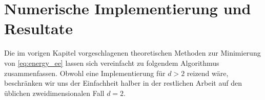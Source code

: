 \documentclass{mythesis}
\begin{document}


\chapter{Numerische Implementierung und Resultate} \label{chap:numerics}

Die im vorigen Kapitel vorgeschlagenen theoretischen Methoden zur Minimierung von \eqref{eq:energy_ee} lassen sich vereinfacht zu folgendem Algorithmus zusammenfassen.
Obwohl eine Implementierung für $d > 2$ reizend wäre, beschränken wir uns der Einfachheit halber in der restlichen Arbeit auf den üblichen zweidimensionalen Fall $d = 2$.

\end{document}
